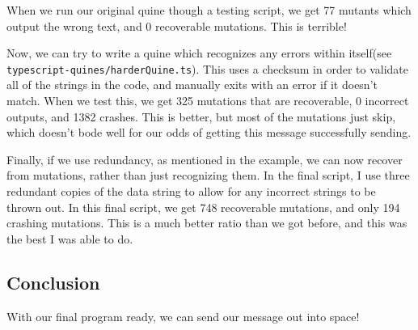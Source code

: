 \documentclass{article}
\begin{document}
When we run our original quine though a testing script,
we get 77 mutants which output the wrong text, and 0 recoverable mutations.
This is terrible!

Now, we can try to write a quine which recognizes any errors within itself(see \verb|typescript-quines/harderQuine.ts|).
This uses a checksum in order to validate all of the strings in the code, and manually exits with an error if it doesn't match.
When we test this, we get 325 mutations that are recoverable, 0 incorrect outputs, and 1382 crashes.
This is better, but most of the mutations just skip, which doesn't bode well for our odds of getting this message successfully sending.

Finally, if we use redundancy, as mentioned in the example, we can now recover from mutations, rather than just recognizing them.
In the final script, I use three redundant copies of the data string to allow for any incorrect strings to be thrown out.
In this final script, we get 748 recoverable mutations, and only 194 crashing mutations.
This is a much better ratio than we got before, and this was the best I was able to do.

\subsection*{Conclusion}
With our final program ready, we can send our message out into space!
\printbibliography
\end{document}

